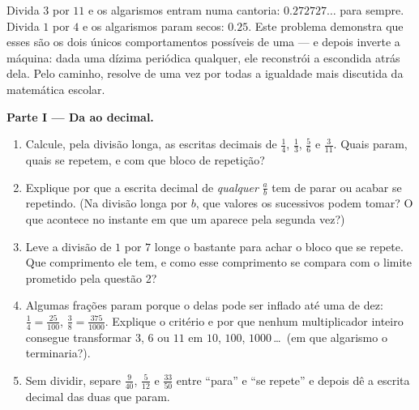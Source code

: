 \begin{problem}
\label{pb:g9:fractions:1}
Divida $3$ por $11$ e os algarismos entram numa cantoria:
$0.272727\ldots$ para sempre. Divida $1$ por $4$ e os algarismos param
secos: $0.25$. Este problema demonstra que esses são os dois únicos
comportamentos possíveis de uma  --- e depois inverte a máquina:
dada uma dízima periódica qualquer, ele reconstrói a  escondida
atrás dela. Pelo caminho, resolve de uma vez por todas a igualdade mais
discutida da matemática escolar.

\medskip
\noindent\textbf{Parte I --- Da  ao decimal.}
\begin{enumerate}
  \item Calcule, pela divisão longa, as escritas decimais de
        $\frac14$, $\frac13$, $\frac56$ e $\frac{3}{11}$. Quais param,
        quais se repetem, e com que bloco de repetição?
  \item Explique por que a escrita decimal de \emph{qualquer} 
        $\frac ab$ tem de parar ou acabar se repetindo. (Na divisão
        longa por $b$, que valores os  sucessivos podem tomar? O
        que acontece no instante em que um  aparece pela segunda
        vez?)
  \item Leve a divisão de $1$ por $7$ longe o bastante para achar o
        bloco que se repete. Que comprimento ele tem, e como esse
        comprimento se compara com o limite prometido pela questão 2?
  \item Algumas frações param porque o  delas pode ser
        inflado até uma  de dez:
        $\frac14 = \frac{25}{100}$,
        $\frac{3}{8} = \frac{375}{1000}$. Explique o critério e por que
        nenhum multiplicador inteiro consegue transformar $3$, $6$ ou
        $11$ em $10$, $100$, $1000$\,\dots\ (em que algarismo o 
        terminaria?).
  \item Sem dividir, separe $\frac{9}{40}$, $\frac{5}{12}$ e
        $\frac{33}{50}$ entre ``para'' e ``se repete'' e depois dê a
        escrita decimal das duas que param.
\end{enumerate}


\end{problem}
